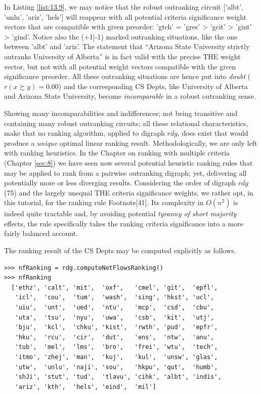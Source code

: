 In Listing \ref{list:13.9}, we may notice that the robust outranking circuit ['albt', 'unlu', 'ariz', 'hels']  will reappear with all potential criteria significance weight vectors that are compatible with given preorder: 'gtch' = 'gres' > 'gcit' > 'gint' > 'gind'. Notice also the (+1|-1) marked outranking situations, like the one between 'albt' and 'ariz'. The statement that ``Arizona State University strictly  outranks University of Alberta'' is in fact valid with the precise THE weight vector, but not with all potential weight vectors compatible with the given significance preorder. All these outranking situations are hence put into \emph{doubt} ($r(x \succsim y) = 0.00$) and the corresponding CS Depts, like University of Alberta and Arizona State University, become \emph{incomparable} in a robust outranking sense.  

Showing many incomparabilities and indifferences; not being transitive and containing many robust outranking circuits; all these relational characteristics, make that no ranking algorithm, applied to digraph $rdg$, does exist that would produce a \emph{unique} optimal linear ranking result. Methodologically, we are only left with ranking heuristics. In the Chapter on ranking with multiple criteria (Chapter \ref{sec:8}) we have seen now several potential heuristic ranking rules that may be applied to rank from a pairwise outranking digraph; yet, delivering all potentially more or less diverging results. Considering the order of digraph $rdg$ (75) and the largely unequal THE criteria significance weights, we rather opt, in this tutorial, for the \NetFlows ranking rule Footnote[41]. Its complexity in $O(n^2)$ is indeed quite tractable and, by avoiding potential \emph{tyranny of short majority} effects, the \NetFlows rule specifically takes the ranking criteria significance into a more fairly balanced account.

The \NetFlows ranking result of the CS Depts may be computed explicitly as follows. 

\begin{lstlisting}[caption={Showing the relation table with stability denotation},label=list:13.9]
>>> nfRanking = rdg.computeNetFlowsRanking()
>>> nfRanking
  ['ethz', 'calt', 'mit',  'oxf',   'cmel', 'git',  'epfl',
   'icl',  'cou',  'tum',  'wash',  'sing', 'hkst', 'ucl',
   'uiu',  'unt',  'ued',  'ntu',   'mcp',  'csd',  'cbu',
   'uta',  'tsu',  'nyu',  'uwa',   'csb',  'kit',  'utj',
   'bju',  'kcl',  'chku', 'kist',  'rwth', 'pud',  'epfr',
   'hku',  'rcu',  'cir',  'dut',   'ens',  'ntw',  'anu',
   'tub',  'mel',  'lms',  'bro',   'frei', 'wtu',  'tech',
   'itmo', 'zhej', 'man',  'kuj',   'kul',  'unsw', 'glas',
   'utw',  'unlu', 'naji', 'sou',   'hkpu', 'qut',  'humb',
   'shJi', 'stut', 'tud',  'tlavu', 'cihk', 'albt', 'indis',
   'ariz', 'kth',  'hels', 'eind',  'mil']
\end{lstlisting}

